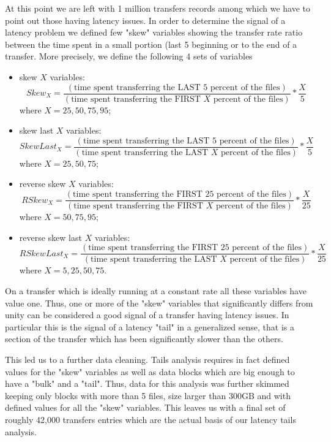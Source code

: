 At this point we are left with 1 million transfers records among which
we have to point out those having latency issues.  In order to
determine the signal of a latency problem we defined few "skew"
variables showing the transfer rate ratio between the time spent in a
small portion (last 5%
beginning or to the end of a transfer.  More precisely, we define the
following 4 sets of variables

\begin{itemize}
\item skew $X$ variables: 
  \begin{equation}
  Skew_X=\frac{\left( \mbox{time spent transferring the LAST 5 percent of the files} \right)}{ \left( \mbox{time spent transferring the FIRST } X \mbox{ percent of the files} \right)} * \frac{X}{5}
  \label{eq:skew}
   \end{equation}
   where $X=25,50,75,95$;
\item skew last $X$ variables: 
  \begin{equation}
   SkewLast_X=\frac{\left( \mbox{time spent transferring the LAST 5 percent of the files}\right)}{\left(\mbox{time spent transferring the LAST } X \mbox{ percent of the files}\right)} * \frac{X}{5}
  \label{eq:skewlast}
  \end{equation} 
   where $X=25,50,75$;
\item reverse skew  $X$ variables: 
  \begin{equation}
    RSkew_X=\frac{\left( \mbox{time spent transferring the FIRST 25 percent of the files}\right)}{\left( \mbox{time spent transferring the FIRST }X \mbox{ percent of the files}\right)} *  \frac{X}{25} 
  \label{eq:revskew}
  \end{equation}  
   where $X=50,75,95$;
\item reverse skew last $X$ variables: 
  \begin{equation}
    RSkewLast_X=\frac{\left(\mbox{time spent transferring the FIRST 25 percent of the files}\right)}{ \left(\mbox{time spent transferring the LAST }X\mbox{ percent of the files}\right)} * \frac{X}{25} 
  \label{eq:revskewlast}
  \end{equation}
   where $X=5,25,50,75$.
\end{itemize}

On a transfer which is ideally running at a constant rate all these
variables have value one. Thus, one or more of the "skew" variables
that significantly differs from unity can be considered a good signal
of a transfer having latency issues. In particular this is the signal
of a latency "tail" in a generalized sense, that is a section of the
transfer which has been significantly slower than the others.

This led us to a further data cleaning. Tails analysis requires in
fact defined values for the "skew" variables as well as data blocks
which are big enough to have a "bulk" and a "tail". Thus, data for
this analysis was further skimmed keeping only blocks with more than 5
files, size larger than 300GB and with defined values for all the
"skew" variables. This leaves us with a final set of roughly 42,000
transfers entries which are the actual basis of our latency tails
analysis.

